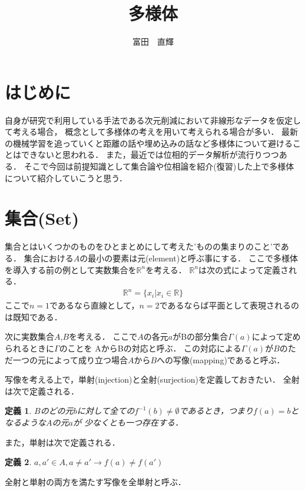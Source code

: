 \documentclass[11pt,a4j]{jarticle}
\title{多様体}
\author{富田　直輝}
\newtheorem{dfn}{定義}
\begin{document}
\maketitle
\section{はじめに}
自身が研究で利用している手法である次元削減において非線形なデータを仮定して考える場合，
概念として多様体の考えを用いて考えられる場合が多い．
最新の機械学習を追っていくと距離の話や埋め込みの話など多様体について避けることはできないと思われる．
また，最近では位相的データ解析が流行りつつある．
そこで今回は前提知識として集合論や位相論を紹介(復習)した上で多様体について紹介していこうと思う．

\section{集合(Set)}
集合とはいくつかのものをひとまとめにして考えた'ものの集まりのこと'である．
集合における$A$の最小の要素は元(element)と呼ぶ事にする．
ここで多様体を導入する前の例として実数集合を$\mathbb{R}^n$を考える．
$\mathbb{R}^n$は次の式によって定義される．
\begin{eqnarray}
    \label{eq:1}
    \mathbb{R}^n=\{x_i | x_i \in  \mathbb{R}\}
\end{eqnarray}
ここで$n=1$であるなら直線として，$n=2$であるならば平面として表現されるのは既知である．

次に実数集合$A$,$B$を考える．
ここで$A$の各元$a$がBの部分集合$\Gamma(a)$によって定められるときに$\Gamma$のことを
AからBの対応と呼ぶ．
この対応による$\Gamma(a)$が$B$のただ一つの元によって成り立つ場合$A$から$B$への写像(mapping)であると呼ぶ．

写像を考える上で，単射(injection)と全射(surjection)を定義しておきたい．
全射は次で定義される．
\begin{dfn}
    $B$のどの元$b$に対して全ての$f^{-1}(b)\neq \emptyset $であるとき，つまり$f(a)=b$となるような$A$の元$a$が
    少なくとも一つ存在する．
\end{dfn}
また，単射は次で定義される．
\begin{dfn}
        $a,a' \in A , a \neq a' \rightarrow f(a)\neq f(a')$
\end{dfn}
全射と単射の両方を満たす写像を全単射と呼ぶ．
\end{document}
